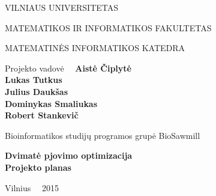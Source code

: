 \documentclass[a4paper,12pt]{article}
\begin{document}
\graphicspath{ {/} }

\renewcommand{\cftdot}{.}	
\renewcommand{\cftsecleader}{\cftdotfill{\cftdotsep}}

\thispagestyle{empty} %


\begin{center}
 VILNIAUS UNIVERSITETAS 
 
MATEMATIKOS IR INFORMATIKOS FAKULTETAS

MATEMATINĖS INFORMATIKOS KATEDRA

\vspace{4cm}

Projekto vadovė \ \ \textbf{Aistė Čiplytė} \\
\textbf{Lukas Tutkus} \\
\textbf{Julius Daukšas} \\
\textbf{Dominykas Smaliukas} \\
\textbf{Robert Stankevič} \\

\vspace{0.2cm}

Bioinformatikos studijų programos grupė BioSawmill



\vspace{3cm}
\textbf{\Large Dvimatė pjovimo optimizacija}\\
\textbf{\Large Projekto planas}

\vfill

Vilnius \ \  2015
\end{center}



\clearpage

\tableofcontents
\clearpage
\end{document}
